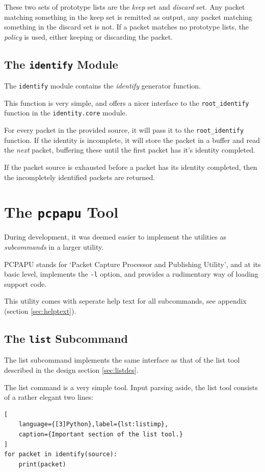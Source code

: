 \documentclass[10pt,a4paper,notitlepage]{report}
\begin{document}
These two sets of prototype lists are the \emph{keep} set and \emph{discard} set.
Any packet matching something in the keep set is remitted as output, any packet matching something in the discard set is not. If a packet matches no prototype lists, the \emph{policy} is used, either keeping or discarding the packet.

\subsection{The \texttt{identify} Module}
The \texttt{identify} module contains the \emph{identify} generator function.

This function is very simple, and offers a nicer interface to the \texttt{root_identify} function in the \texttt{identity.core} module.

For every packet in the provided source, it will pass it to the \texttt{root_identify} function. If the identity is incomplete, it will store the packet in a buffer and read the \emph{next} packet, buffering these until the first packet has it's identity completed.

If the packet source is exhausted before a packet has its identity completed, then the incompletely identified packets are returned.

\section{The \texttt{pcpapu} Tool}
During development, it was deemed easier to implement the utilities as \emph{subcommands} in a larger utility.

PCPAPU stands for `Packet Capture Processor and Publishing Utility', and at its basic level, implements the \texttt{-l} option, and provides a rudimentary way of loading support code.

This utility comes with seperate help text for all subcommands, see appendix (section \ref{sec:helptext}).

\subsection{The \texttt{list} Subcommand}
The list subcommand implements the same interface as that of the list tool described in the design section \ref{sec:listdes}.

The list command is a very simple tool. Input parsing aside, the list tool consists of a rather elegant two lines:
\begin{lstlisting}[
	language={[3]Python},label={lst:listimp},
	caption={Important section of the list tool.}
]
for packet in identify(source):
    print(packet)
\end{lstlisting}
\end{document}
